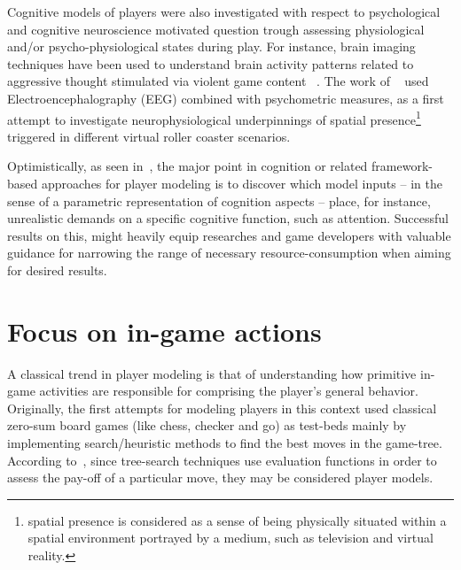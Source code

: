 Cognitive models of players were also investigated with respect to psychological and cognitive neuroscience motivated question trough assessing physiological and/or psycho-physiological states during play. For instance, brain imaging techniques have been used to understand brain activity patterns related to aggressive thought stimulated via violent game content ~\citep{weber_does_2006}. The work of ~\cite{baumgartner_neural_2006} used Electroencephalography (EEG) combined with psychometric measures, as a first attempt to investigate neurophysiological underpinnings of spatial presence\footnote{spatial presence is considered as a sense of being physically situated within a spatial environment portrayed by a medium, such as television and virtual reality.} triggered in different virtual roller coaster scenarios.

Optimistically, as seen in~\cite{bohil_cognitive_2007}, the major point in cognition or related framework-based approaches for player modeling is to discover which model inputs -- in the sense of a parametric representation of cognition aspects -- place, for instance, unrealistic demands on a specific cognitive function, such as attention. Successful results on this, might heavily equip researches and game developers with valuable guidance for narrowing the range of necessary resource-consumption when aiming for desired results.   

\section{Focus on in-game actions}
A classical trend in player modeling is that of understanding how primitive in-game activities are responsible for comprising the player's general behavior. Originally, the first attempts for modeling players in this context used classical zero-sum board games (like chess, checker and go) as test-beds mainly by implementing search/heuristic methods to find the best moves in the game-tree. According to~\cite{bakkes_player_2012}, since tree-search techniques use evaluation functions in order to assess the pay-off of a particular move, they may be considered player models.

